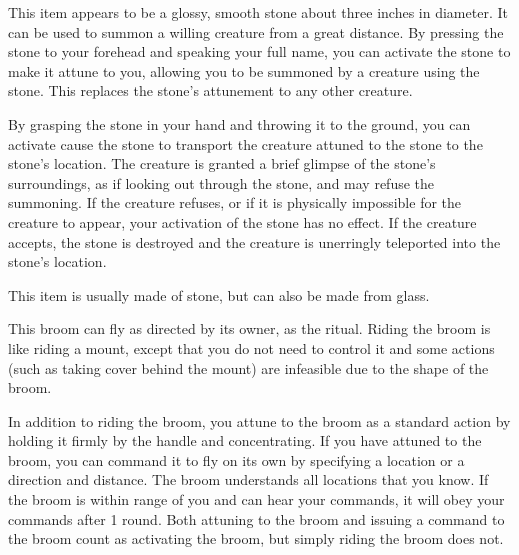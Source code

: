 
             This item appears to be a glossy, smooth stone about three inches in diameter.
            It can be used to summon a willing creature from a great distance.
            By pressing the stone to your forehead and speaking your full name, you can activate the stone to make it attune to you, allowing you to be summoned by a creature using the stone.
            This replaces the stone's attunement to any other creature.

            By grasping the stone in your hand and throwing it to the ground, you can activate cause the stone to transport the creature attuned to the stone to the stone's location.
            The creature is granted a brief glimpse of the stone's surroundings, as if looking out through the stone, and may refuse the summoning.
            If the creature refuses, or if it is physically impossible for the creature to appear, your activation of the stone has no effect.
            If the creature accepts, the stone is destroyed and the creature is unerringly teleported into the stone's location.

            This item is usually made of stone, but can also be made from glass.


             This broom can fly as directed by its owner, as the  ritual.
            Riding the broom is like riding a mount, except that you do not need to control it and some actions (such as taking cover behind the mount) are infeasible due to the shape of the broom.

            In addition to riding the broom, you attune to the broom as a standard action by holding it firmly by the handle and concentrating.
            If you have attuned to the broom, you can command it to fly on its own by specifying a location or a direction and distance.
            The broom understands all locations that you know.
            If the broom is within \rngext range of you and can hear your commands, it will obey your commands after 1 round.
            Both attuning to the broom and issuing a command to the broom count as activating the broom, but simply riding the broom does not.

